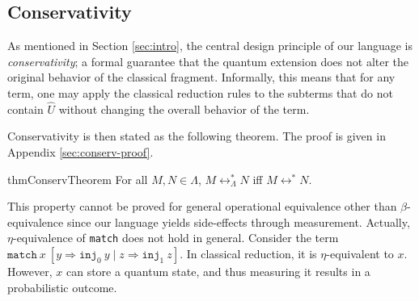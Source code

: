 \subsection{Conservativity}
As mentioned in Section \ref{sec:intro}, the central design principle of our language is \textit{conservativity}; a formal guarantee that the quantum extension does not alter the original behavior of the classical fragment.
Informally, this means that for any term, one may apply the classical reduction rules to the subterms that do not contain $\hat{U}$ without changing the overall behavior of the term.

Conservativity is then stated as the following theorem.
The proof is given in Appendix \ref{sec:conserv-proof}.
\begin{restatable}[Conservativity]{thm}{ConservTheorem} \label{thm:conservativity}
  For all $M, N \in \Lambda$, $M \longleftrightarrow^*_\Lambda N$ iff $M \longleftrightarrow^* N$.
\end{restatable}
This property cannot be proved for general operational equivalence other than $\beta$-equivalence since our language yields side-effects through measurement.
Actually, $\eta$-equivalence of \texttt{match} does not hold in general.
Consider the term $\texttt{match}\ x\ [y\Rightarrow \texttt{inj}_0\ y\mid z\Rightarrow \texttt{inj}_1\ z]$.
In classical reduction, it is $\eta$-equivalent to $x$.
However, $x$ can store a quantum state, and thus measuring it results in a probabilistic outcome.
